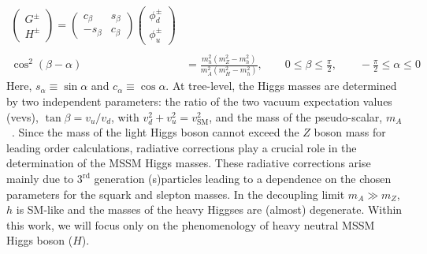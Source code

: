 \documentclass[11pt,a4paper]{article}
\begin{document}
\begin{align}
\begin{pmatrix}G^\pm\\ H^\pm\end{pmatrix} = \begin{pmatrix} c_\beta & s_\beta\\ -s_\beta & c_\beta\end{pmatrix} \begin{pmatrix}\phi_d^\pm\\ \phi_u^\pm\end{pmatrix}\nonumber\\\nonumber\\
\cos^2\left(\beta - \alpha\right) &= \frac{m_h^2\left(m_Z^2 - m_h^2\right)}{m_A^2\left(m_H^2 - m_h^2\right)},\qquad 0 \le \beta \le \frac{\pi}{2},\qquad -\frac{\pi}{2} \le \alpha \le 0\label{eq_mixingangles}
\end{align}
%
Here, $s_\alpha \equiv \sin\alpha$ and $c_\alpha \equiv \cos\alpha$. At tree-level, the Higgs masses are determined by two independent parameters: the ratio of the two vacuum expectation values (vevs), $\tan\beta = v_u/v_d$, with $v_d^2 + v_u^2 = v_\text{SM}^2$, and the mass of the pseudo-scalar, $m_A$~\cite{Gunion:1989we, Djouadi:2005gj, Drees:873465}. Since the mass of the light Higgs boson cannot exceed the $Z$ boson mass for leading order calculations, radiative corrections play a crucial role in the determination of the MSSM Higgs masses. These radiative corrections arise mainly due to $3^\text{rd}$ generation (s)particles leading to a dependence on the chosen parameters for the squark and slepton masses. In the decoupling limit $m_A \gg m_Z$, $h$ is SM-like and the masses of the heavy Higgses are (almost) degenerate. Within this work, we will focus only on the phenomenology of heavy neutral MSSM Higgs boson ($H$).
\end{document}

